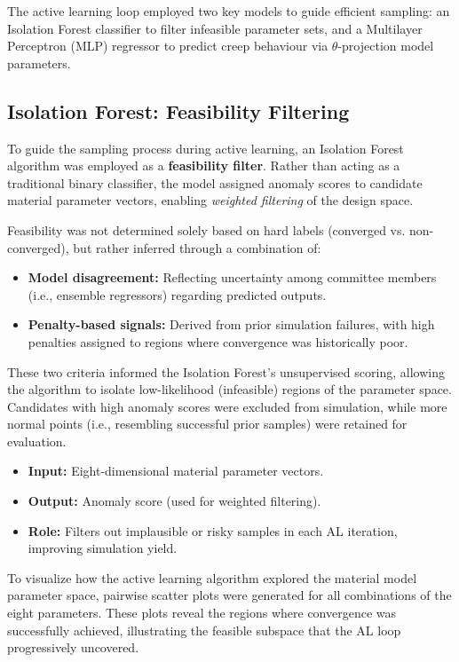 \documentclass[class=scrbook, crop=false]{standalone}
\begin{document}
	The active learning loop employed two key models to guide efficient sampling: an Isolation Forest classifier to filter infeasible parameter sets, and a Multilayer Perceptron (MLP) regressor to predict creep behaviour via $\theta$-projection model parameters.
		
	\subsection{Isolation Forest: Feasibility Filtering}
	\label{Subsection::Results_IF}
	
	To guide the sampling process during active learning, an Isolation Forest algorithm was employed as a \textbf{feasibility filter}. Rather than acting as a traditional binary classifier, the model assigned anomaly scores to candidate material parameter vectors, enabling \textit{weighted filtering} of the design space.
	
	Feasibility was not determined solely based on hard labels (converged vs. non-converged), but rather inferred through a combination of:
	\begin{itemize}
		\item \textbf{Model disagreement:} Reflecting uncertainty among committee members (i.e., ensemble regressors) regarding predicted outputs.
		\item \textbf{Penalty-based signals:} Derived from prior simulation failures, with high penalties assigned to regions where convergence was historically poor.
	\end{itemize}
	
	These two criteria informed the Isolation Forest’s unsupervised scoring, allowing the algorithm to isolate low-likelihood (infeasible) regions of the parameter space. Candidates with high anomaly scores were excluded from simulation, while more normal points (i.e., resembling successful prior samples) were retained for evaluation.
	
	\begin{itemize}
		\item \textbf{Input:} Eight-dimensional material parameter vectors.
		\item \textbf{Output:} Anomaly score (used for weighted filtering).
		\item \textbf{Role:} Filters out implausible or risky samples in each AL iteration, improving simulation yield.
	\end{itemize}
	
	To visualize how the active learning algorithm explored the material model parameter space, pairwise scatter plots were generated for all combinations of the eight parameters. These plots reveal the regions where convergence was successfully achieved, illustrating the feasible subspace that the AL loop progressively uncovered.
	
\end{document}
